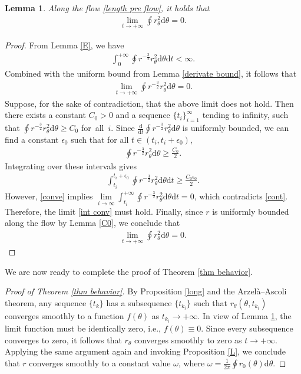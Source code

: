 \documentclass[reqno,11pt, letterpaper]{amsart}
\theoremstyle{plain}
\newtheorem{lem}[thm]{Lemma}
\theoremstyle{definition}
\def\d{\mathrm d}
\numberwithin{equation}{section}
\begin{document}
\begin{lem}\label{L2}
	Along the flow \eqref{length pre flow}, it holds that
	\begin{align*}
		\lim\limits_{t\rightarrow+\infty}\oint r_\theta^2\d\theta=0.
	\end{align*}
\end{lem}
\begin{proof}
	From Lemma \ref{E}, we have
	\begin{align}\label{conve}
		\int_{0}^{+\infty}\oint r^{-\frac{3}{2}} r_\theta^2\d\theta\d t<\infty.
	\end{align} 
	Combined with the uniform bound from Lemma \ref{derivate bound}, it follows that
	\begin{align}\label{int conv}
		\lim\limits_{t\rightarrow+\infty}\oint r^{-\frac{3}{2}} r_\theta^2\d\theta=0.
	\end{align}
	Suppose, for the sake of contradiction, that the above limit does not hold. Then there exists a constant $C_0 > 0$ and a sequence  $\{t_i\}_{i=1}^\infty$ tending to infinity, such that $\oint r^{-\frac{3}{2}} r_\theta^2\d\theta\ge C_0$ for all $i$. Since $\frac{\d}{\d t}\oint r^{-\frac{3}{2}} r_\theta^2\d\theta$ is uniformly bounded, we can find a constant $\epsilon_0$ such that for all
	$t\in(t_i,t_i+\epsilon_0)$, 
	\begin{align*}
		\oint r^{-\frac{3}{2}} r_\theta^2\d\theta\ge \frac{C_0}{2}.
	\end{align*}
	 Integrating over these intervals gives
	\begin{align}\label{cont}
		\int_{t_i}^{t_i+\epsilon_0}\oint r^{-\frac{3}{2}} r_\theta^2\d\theta\d t\ge\frac{C_0\epsilon_0}{2}.
	\end{align}
	However, \eqref{conve} implies $\lim\limits_{i\rightarrow\infty}\int_{t_i}^{+\infty}\oint r^{-\frac{3}{2}} r_\theta^2\d\theta\d t=0$, which contradicts \eqref{cont}. Therefore, the limit \eqref{int conv} must hold. Finally, since $r$ is uniformly bounded along the flow by Lemma \ref{C0}, we conclude that
		\begin{align*}
		\lim\limits_{t\rightarrow+\infty}\oint r_\theta^2\d\theta=0.
	\end{align*}
\end{proof}

We are now ready to complete the proof of Theorem \ref{thm behavior}.
\begin{proof}[Proof of Theorem \ref{thm behavior}]
	By Proposition \ref{long} and the Arzel\`a–Ascoli theorem, any sequence $\{t_k\}$ has a subsequence $\{t_{k_i}\}$ such that $ r_\theta(\theta, t_{k_i})$ converges smoothly to a function $f(\theta)$ as $t_{k_i} \to +\infty$. In view of Lemma \ref{L2}, the limit function must be identically zero, i.e., $f(\theta) \equiv 0$. Since every subsequence converges to zero, it follows that $ r_\theta$ converges smoothly to zero as $t \to +\infty$. Applying the same argument again and invoking Proposition \ref{L}, we conclude that $ r$ converges smoothly to a constant value $\omega$, where $\omega=\frac{1}{2\pi}\oint r_0(\theta)\d\theta$.
\end{proof}
\end{document}
